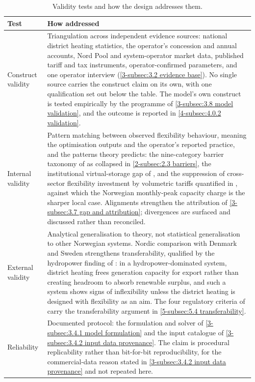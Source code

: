 \begin{table}[h]
\centering
\caption{Validity tests and how the design addresses them.}
\small
\begin{tabular}{p{3.2cm} p{10.3cm}}
\toprule
\textbf{Test} & \textbf{How addressed} \\
\midrule
Construct validity &
Triangulation across independent evidence sources: national district heating statistics, the operator's concession and annual accounts, Nord Pool and system-operator market data, published tariff and tax instruments, operator-confirmed parameters, and one operator interview (\autoref{3-subsec:3.2 evidence base}). No single source carries the construct claim on its own, with one qualification set out below the table. The model's own construct is tested empirically by the programme of \autoref{3-subsec:3.8 model validation}, and the outcome is reported in \autoref{4-subsec:4.0.2 validation}. \\
\addlinespace
Internal validity &
Pattern matching between observed flexibility behaviour, meaning the optimisation outputs and the operator's reported practice, and the patterns theory predicts: the nine-category barrier taxonomy of \cite{sneum_barriers_2021} as collapsed in \autoref{2-subsec:2.3 barriers}, the institutional virtual-storage gap of \cite{mitridati_heat_2020}, and the suppression of cross-sector flexibility investment by volumetric tariffs quantified in \cite{bergaentzle_cross-sector_2022}, against which the Norwegian monthly-peak capacity charge is the sharper local case. Alignments strengthen the attribution of \autoref{3-subsec:3.7 gap and attribution}; divergences are surfaced and discussed rather than reconciled. \\
\addlinespace
External validity &
Analytical generalisation to theory, not statistical generalisation to other Norwegian systems. Nordic comparison with Denmark and Sweden strengthens transferability, qualified by the hydropower finding of \cite{askeland_balancing_2019}: in a hydropower-dominated system, district heating frees generation capacity for export rather than creating headroom to absorb renewable surplus, and such a system shows signs of inflexibility unless the district heating is designed with flexibility as an aim. The four regulatory criteria of \cite{bergaentzle_electricity_2019} carry the transferability argument in \autoref{5-subsec:5.4 transferability}. \\
\addlinespace
Reliability &
Documented protocol: the formulation and solver of \autoref{3-subsec:3.4.1 model formulation} and the input catalogue of \autoref{3-subsec:3.4.2 input data provenance}. The claim is procedural replicability rather than bit-for-bit reproducibility, for the commercial-data reason stated in \autoref{3-subsec:3.4.2 input data provenance} and not repeated here. \\
\bottomrule
\end{tabular}
\label{tab:3.9 validity tests}
\end{table}

